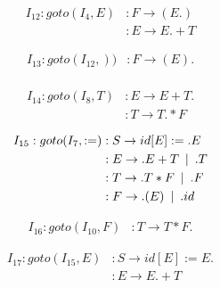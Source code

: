 \documentclass{article}
\newcommand\tab[1][5pt]{\hspace*{#1}}
\newcommand\sep{\tab | \tab }
\begin{document}
\begin{figure}[h!]
\begin{multicols}{2}
\begin{equation*}
\begin{aligned}
I_{12} : goto(I_4,E) &: F \rightarrow (E.)  \\
&: E \rightarrow E.+T 
\end{aligned}
\end{equation*}


\begin{equation*}
\begin{aligned}
I_{13} : goto(I_{12},)) &: F \rightarrow (E).  \\
\end{aligned}
\end{equation*}


\begin{equation*}
\begin{aligned}
I_{14} : goto(I_8,T) &: E \rightarrow E+T.  \\
&: T \rightarrow T.*F
\end{aligned}
\end{equation*}

\begin{equation*}
\begin{aligned}
I_{15} : goto(I_7,:=) &: S \rightarrow id[E] := .E  \\
&: E \rightarrow .E+T \tab | \tab .T \\
&: T \rightarrow .T*F \tab | \tab  .F \\
&: F \rightarrow .(E) \sep .id \\
\end{aligned}
\end{equation*}

\begin{equation*}
\begin{aligned}
I_{16} : goto(I_{10},F) &: T \rightarrow T*F.
\end{aligned}
\end{equation*}


\begin{equation*}
\begin{aligned}
I_{17} : goto(I_{15},E) &: S \rightarrow id[E] := E. \\
&: E \rightarrow E.+T \\
\end{aligned}
\end{equation*}


\end{multicols}
\end{figure}
\end{document}
